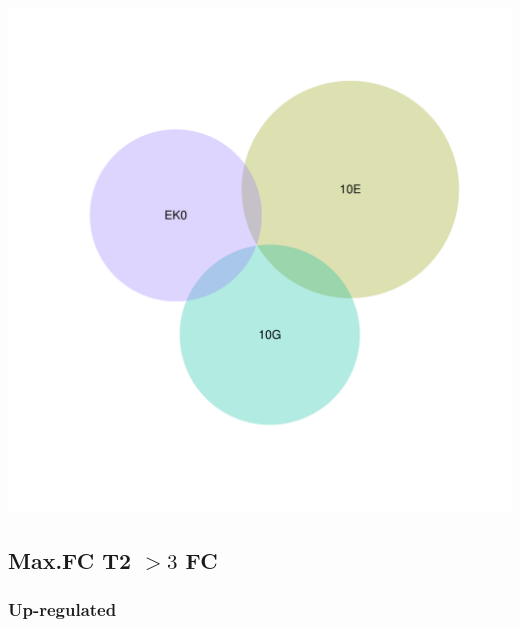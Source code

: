 \documentclass{article}\usepackage[]{graphicx}\usepackage[]{color}
\newenvironment{knitrout}{}{} %
\begin{document}
\begin{knitrout}
\color{fgcolor}

{\centering \includegraphics[width=1\linewidth,height=.4\textheight]{figure/minimal-venn_t1_3fc_down_euler-1} 

}



\end{knitrout}
\clearpage

\subsection{Max.FC T2 $>3$ FC}
\subsubsection{Up-regulated}
\end{document}
